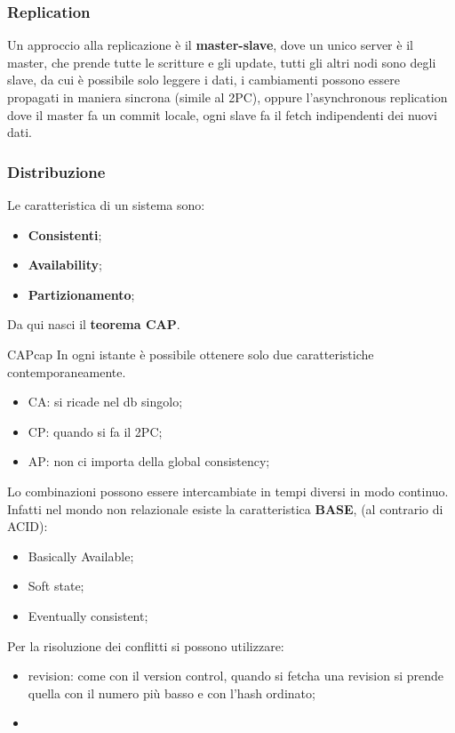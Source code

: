 \documentclass[12pt]{article}
\begin{document}
\subsubsection{Replication}
Un approccio alla replicazione \`e il \textbf{master-slave}, dove un unico server \`e il master, che prende tutte le scritture e gli update, tutti gli altri nodi sono degli slave, da cui \`e possibile solo leggere i dati, i cambiamenti possono essere propagati in maniera sincrona (simile al 2PC), oppure l'asynchronous replication dove il master fa un commit locale, ogni slave fa il fetch indipendenti dei nuovi dati.


\subsubsection{Distribuzione}
Le caratteristica di un sistema sono:
\begin{itemize}
    \item \textbf{Consistenti};
    \item \textbf{Availability};
    \item \textbf{Partizionamento};
\end{itemize}
Da qui nasci il \textbf{teorema CAP}.
\begin{theorem}{CAP}{cap}
    In ogni istante \`e possibile ottenere solo due caratteristiche contemporaneamente.
\end{theorem}
\begin{itemize}
    \item CA: si ricade nel db singolo;
    \item CP: quando si fa il 2PC;
    \item AP: non ci importa della global consistency;
\end{itemize}
Lo combinazioni possono essere intercambiate in tempi diversi in modo continuo. Infatti nel mondo non relazionale esiste la caratteristica \textbf{BASE}, (al contrario di ACID):
\begin{itemize}
    \item Basically Available;
    \item Soft state;
    \item Eventually consistent;
\end{itemize}
Per la risoluzione dei conflitti si possono utilizzare:
\begin{itemize}
    \item revision: come con il version control, quando si fetcha una revision si prende quella con il numero pi\`u basso e con l'hash ordinato;
    \item 
\end{itemize}
\end{document}
